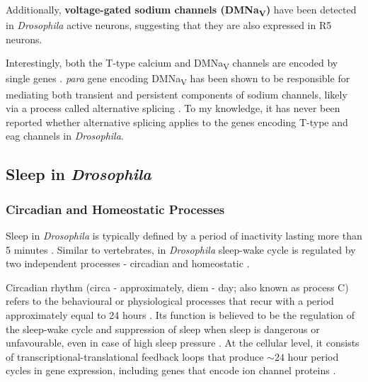 \documentclass[../main.tex]{subfiles}
\begin{document}
Additionally, \textbf{voltage-gated sodium channels (DMNa\textsubscript{V})} have been detected in \textit{Drosophila} active neurons, suggesting that they are also expressed in R5 neurons.

Interestingly, both the T-type calcium and DMNa\textsubscript{V} channels are encoded by single genes \parencite{jeongCaa1TFlyTtype2015,ravenscroftDrosophilaVoltageGatedSodium2020}. \textit{para} gene encoding DMNa\textsubscript{V} has been shown to be responsible for mediating both transient and persistent components of sodium channels, likely via a process called alternative splicing \parencite{linAlternativeSplicingVoltageGated2009}. To my knowledge, it has never been reported whether alternative splicing applies to the genes encoding T-type and \gls{eag} channels in \textit{Drosophila}.



\subsection{Sleep in \textit{Drosophila}}

\subsubsection{Circadian and Homeostatic Processes}

Sleep in \textit{Drosophila} is typically defined by a period of inactivity lasting more than 5 minutes \parencite{dubowyCircadianRhythmsSleep2017,shaferRegulationDrosophilaSleep2021}. Similar to vertebrates, in \textit{Drosophila} sleep-wake cycle is regulated by two independent processes - circadian and homeostatic \parencite{doppSinglecellTranscriptomicsReveals2024,liuSleepDriveEncoded2016}.

Circadian rhythm (circa - approximately, diem - day; also known as process C) refers to the behavioural or physiological processes that recur with a period approximately equal to 24 hours \parencite{fernandez-chiappeHighFrequencyNeuronalBursting2021,dubowyCircadianRhythmsSleep2017}. Its function is believed to be the regulation of the sleep-wake cycle and suppression of sleep when sleep is dangerous or unfavourable, even in case of high sleep pressure \parencite{shaferRegulationDrosophilaSleep2021,andreaniCircadianProgrammingEllipsoid2022}.
At the cellular level, it consists of transcriptional-translational feedback loops that produce $\sim 24$ hour period cycles in gene expression, including genes that encode ion channel proteins
\parencite{doppSinglecellTranscriptomicsReveals2024,dubowyCircadianRhythmsSleep2017,andreaniCircadianProgrammingEllipsoid2022}.
\end{document}
